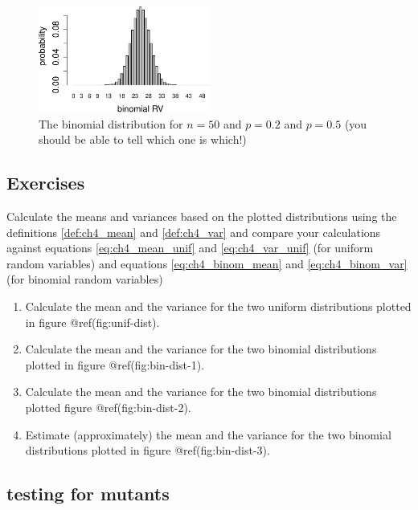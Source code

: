 \documentclass[
  letterpaper,
  DIV=11,
  numbers=noendperiod]{scrreprt}
\begin{document}
\begin{figure}

{\centering \includegraphics[width=0.5\textwidth,height=\textheight]{./probdist_files/figure-pdf/bin-dist-3-2.pdf}

}

\caption{The binomial distribution for \(n=50\) and \(p=0.2\) and
\(p=0.5\) (you should be able to tell which one is which!)}

\end{figure}

\hypertarget{exercises-11}{%
\subsection{Exercises}\label{exercises-11}}

Calculate the means and variances based on the plotted distributions
using the definitions \ref{def:ch4_mean} and \ref{def:ch4_var} and
compare your calculations against equations \ref{eq:ch4_mean_unif} and
\ref{eq:ch4_var_unif} (for uniform random variables) and equations
\ref{eq:ch4_binom_mean} and \ref{eq:ch4_binom_var} (for binomial random
variables)

\begin{enumerate}
\def\labelenumi{\arabic{enumi}.}
\item
  Calculate the mean and the variance for the two uniform distributions
  plotted in figure @ref(fig:unif-dist).
\item
  Calculate the mean and the variance for the two binomial distributions
  plotted in figure @ref(fig:bin-dist-1).
\item
  Calculate the mean and the variance for the two binomial distributions
  plotted figure @ref(fig:bin-dist-2).
\item
  Estimate (approximately) the mean and the variance for the two
  binomial distributions plotted in figure @ref(fig:bin-dist-3).
\end{enumerate}

\hypertarget{testing-for-mutants}{%
\subsection{testing for mutants}\label{testing-for-mutants}}
\end{document}
